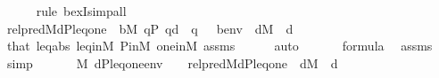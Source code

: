 \begin{isabellebody}
\ \ \ \ \isamarkupfalse%
\ {\isacharparenleft}{\kern0pt}rule\ bexI{\isacharcomma}{\kern0pt}simp{\isacharunderscore}{\kern0pt}all{\isacharparenright}{\kern0pt}\isanewline
\ \ \isamarkupfalse%
\isanewline
\ \ \isamarkupfalse%
\ {\isachardoublequoteopen}{\isacharquery}{\kern0pt}rel{\isacharunderscore}{\kern0pt}pred{\isacharparenleft}{\kern0pt}M{\isacharcomma}{\kern0pt}d{\isacharcomma}{\kern0pt}P{\isacharcomma}{\kern0pt}leq{\isacharcomma}{\kern0pt}one{\isacharparenright}{\kern0pt}\ {\isasymlongleftrightarrow}\ {\isacharparenleft}{\kern0pt}{\isasymexists}b{\isasymin}M{\isachardot}{\kern0pt}\ {\isasymforall}q{\isasymin}P{\isachardot}{\kern0pt}\ q{\isasympreceq}d\ {\isasymlongrightarrow}\ {\isasymnot}{\isacharparenleft}{\kern0pt}q\ {\isasymtturnstile}\ {\isasymphi}\ {\isacharparenleft}{\kern0pt}{\isacharbrackleft}{\kern0pt}b{\isacharbrackright}{\kern0pt}{\isacharat}{\kern0pt}env{\isacharparenright}{\kern0pt}{\isacharparenright}{\kern0pt}{\isacharparenright}{\kern0pt}{\isachardoublequoteclose}\ \ {\isachardoublequoteopen}d{\isasymin}M{\isachardoublequoteclose}\ \ d\isanewline
\ \ \ \ \isamarkupfalse%
\ that\ leq{\isacharunderscore}{\kern0pt}abs\ leq{\isacharunderscore}{\kern0pt}in{\isacharunderscore}{\kern0pt}M\ P{\isacharunderscore}{\kern0pt}in{\isacharunderscore}{\kern0pt}M\ one{\isacharunderscore}{\kern0pt}in{\isacharunderscore}{\kern0pt}M\ assms\isanewline
\ \ \ \ \isamarkupfalse%
\ auto\isanewline
\ \ \isamarkupfalse%
\isanewline
\ \ \isamarkupfalse%
\ {\isachardoublequoteopen}{\isacharquery}{\kern0pt}{\isasympsi}{\isasymin}formula{\isachardoublequoteclose}\ \isamarkupfalse%
\ assms\ \isamarkupfalse%
\ simp\isanewline
\ \ \isamarkupfalse%
\isanewline
\ \ \isamarkupfalse%
\ {\isachardoublequoteopen}{\isacharparenleft}{\kern0pt}M{\isacharcomma}{\kern0pt}\ {\isacharbrackleft}{\kern0pt}d{\isacharcomma}{\kern0pt}P{\isacharcomma}{\kern0pt}leq{\isacharcomma}{\kern0pt}one{\isacharbrackright}{\kern0pt}{\isacharat}{\kern0pt}env\ {\isasymTurnstile}\ {\isacharquery}{\kern0pt}{\isasympsi}{\isacharparenright}{\kern0pt}\ {\isasymlongleftrightarrow}\ {\isacharquery}{\kern0pt}rel{\isacharunderscore}{\kern0pt}pred{\isacharparenleft}{\kern0pt}M{\isacharcomma}{\kern0pt}d{\isacharcomma}{\kern0pt}P{\isacharcomma}{\kern0pt}leq{\isacharcomma}{\kern0pt}one{\isacharparenright}{\kern0pt}{\isachardoublequoteclose}\ \ {\isachardoublequoteopen}d{\isasymin}M{\isachardoublequoteclose}\ \ d\isanewline

\end{isabellebody}
